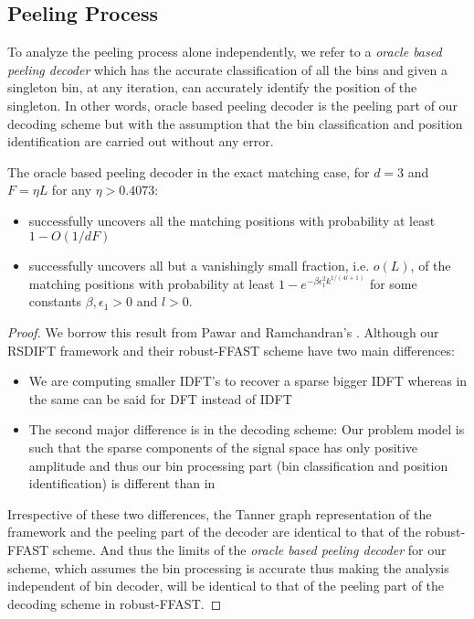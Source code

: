 \documentclass[journal,11pt,onecolumn]{IEEEtran}  %
\begin{document}
\subsection{\bf Peeling Process}
To analyze the peeling process alone independently, we refer to a {\it oracle based peeling decoder} which has the accurate classification of all the bins and given a singleton bin, at any iteration, can accurately identify the position of the singleton. In other words, oracle based peeling decoder is the peeling part of our decoding scheme but with the assumption that the bin classification and position identification are carried out without any error.
\begin{lemma}
The oracle based peeling decoder in the exact matching case, for $d=3$ and $F=\eta L$ for any $\eta>0.4073$:
\begin{itemize}
\item successfully uncovers all the matching positions with probability at least $1-O(1/dF)$
\item successfully uncovers all but a vanishingly small fraction, i.e. $o(L)$, of the matching positions with probability at least $1-e^{-\beta \epsilon_1^2k^{1/(4l+1)}}$ for some constants $\beta,\epsilon_1>0$ and $l>0.$
\end{itemize}
\end{lemma}
\begin{proof}
We borrow this result from Pawar and Ramchandran's \cite{pawar2014robust}. Although our RSDIFT framework and their robust-FFAST scheme have two main differences: 
\begin{itemize}
\item We are computing smaller IDFT's to recover a sparse bigger IDFT whereas in \cite{pawar2014robust} the same can be said for  DFT instead of IDFT
\item The second major difference is in the decoding scheme: Our problem model is such that the sparse components of the signal space has only positive amplitude and thus our bin processing part (bin classification and position identification) is different than in \cite{pawar2014robust}
\end{itemize}
Irrespective of these two differences, the Tanner graph representation of the framework and the peeling part of the decoder are identical to that of the robust-FFAST scheme. And thus the limits of the {\it oracle based peeling decoder} for our scheme, which assumes the bin processing is accurate thus making the analysis independent of bin decoder, will be identical to that of the peeling part of the decoding scheme in robust-FFAST.
\end{proof}
\end{document}
